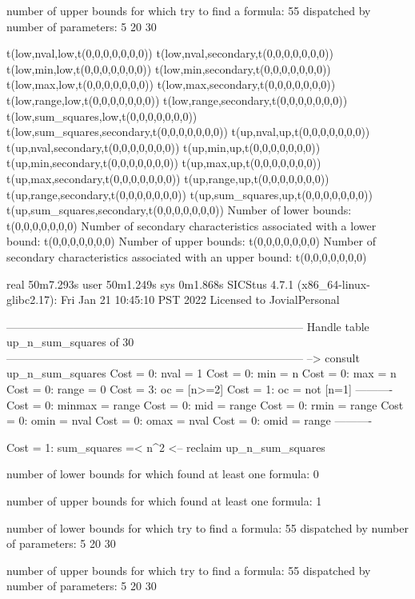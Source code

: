 number of upper bounds for which try to find a formula: 55
dispatched by number of parameters: 5  20  30

t(low,nval,low,t(0,0,0,0,0,0,0))
t(low,nval,secondary,t(0,0,0,0,0,0,0))
t(low,min,low,t(0,0,0,0,0,0,0))
t(low,min,secondary,t(0,0,0,0,0,0,0))
t(low,max,low,t(0,0,0,0,0,0,0))
t(low,max,secondary,t(0,0,0,0,0,0,0))
t(low,range,low,t(0,0,0,0,0,0,0))
t(low,range,secondary,t(0,0,0,0,0,0,0))
t(low,sum_squares,low,t(0,0,0,0,0,0,0))
t(low,sum_squares,secondary,t(0,0,0,0,0,0,0))
t(up,nval,up,t(0,0,0,0,0,0,0))
t(up,nval,secondary,t(0,0,0,0,0,0,0))
t(up,min,up,t(0,0,0,0,0,0,0))
t(up,min,secondary,t(0,0,0,0,0,0,0))
t(up,max,up,t(0,0,0,0,0,0,0))
t(up,max,secondary,t(0,0,0,0,0,0,0))
t(up,range,up,t(0,0,0,0,0,0,0))
t(up,range,secondary,t(0,0,0,0,0,0,0))
t(up,sum_squares,up,t(0,0,0,0,0,0,0))
t(up,sum_squares,secondary,t(0,0,0,0,0,0,0))
Number of lower bounds:                                             t(0,0,0,0,0,0,0)
Number of secondary characteristics associated with a lower bound:  t(0,0,0,0,0,0,0)
Number of upper bounds:                                             t(0,0,0,0,0,0,0)
Number of secondary characteristics associated with an upper bound: t(0,0,0,0,0,0,0)

real	50m7.293s
user	50m1.249s
sys	0m1.868s
SICStus 4.7.1 (x86_64-linux-glibc2.17): Fri Jan 21 10:45:10 PST 2022
Licensed to JovialPersonal


--------------------------------------------------------------------------------
Handle table up_n_sum_squares of 30
--------------------------------------------------------------------------------
--> consult up_n_sum_squares
Cost =  0:  nval   = 1
Cost =  0:  min    = n
Cost =  0:  max    = n
Cost =  0:  range  = 0
Cost =  3:  oc     = [n>=2]
Cost =  1:  oc     = not [n=1]
----------
Cost =  0:  minmax = range
Cost =  0:  mid    = range
Cost =  0:  rmin   = range
Cost =  0:  omin   = nval
Cost =  0:  omax   = nval
Cost =  0:  omid   = range
----------

Cost =  1:  sum_squares =< n^2
<-- reclaim up_n_sum_squares

number of lower bounds for which found at least one formula: 0

number of upper bounds for which found at least one formula: 1

number of lower bounds for which try to find a formula: 55
dispatched by number of parameters: 5  20  30

number of upper bounds for which try to find a formula: 55
dispatched by number of parameters: 5  20  30

